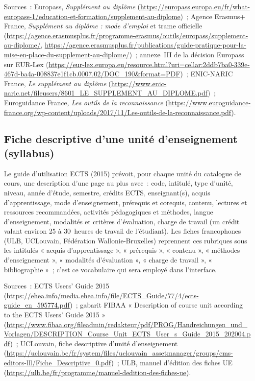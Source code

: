 \documentclass[11pt,a4paper]{article}
\begin{document}
Sources~: Europass, \emph{Supplément au diplôme}
(\url{https://europass.europa.eu/fr/what-europass-1/education-et-formation/supplement-au-diplome})~;
Agence Erasmus+ France, \emph{Supplément au diplôme : mode d'emploi} et trame officielle
(\url{https://agence.erasmusplus.fr/programme-erasmus/outils/europass/supplement-au-diplome/},
\url{https://agence.erasmusplus.fr/publications/guide-pratique-pour-la-mise-en-place-du-supplement-au-diplome/})~;
annexe~III de la décision Europass sur EUR-Lex
(\url{https://eur-lex.europa.eu/resource.html?uri=cellar:2ddb7ba0-339e-467d-ba4a-008837e1f1cb.0007.02/DOC_190&format=PDF})~;
ENIC-NARIC France, \emph{Le supplément au diplôme}
(\url{https://www.enic-naric.net/fileusers/8601_LE_SUPPLEMENT_AU_DIPLOME.pdf})~;
Euroguidance France, \emph{Les outils de la reconnaissance}
(\url{https://www.euroguidance-france.org/wp-content/uploads/2017/11/Les-outils-de-la-reconnaissance.pdf}).

\subsection{Fiche descriptive d'une unité d'enseignement (syllabus)}

Le guide d'utilisation ECTS (2015) prévoit, pour chaque unité du catalogue de cours, une
description d'une page au plus avec~: code, intitulé, type d'unité, niveau, année
d'étude, semestre, crédits ECTS, enseignant(s), acquis d'apprentissage, mode
d'enseignement, prérequis et corequis, contenu, lectures et ressources recommandées,
activités pédagogiques et méthodes, langue d'enseignement, modalités et critères
d'évaluation, charge de travail (un crédit valant environ 25 à 30~heures de travail de
l'étudiant). Les fiches francophones (ULB, UCLouvain, Fédération Wallonie-Bruxelles)
reprennent ces rubriques sous les intitulés « acquis d'apprentissage », « prérequis »,
« contenu », « méthodes d'enseignement », « modalités d'évaluation », « charge de travail
», « bibliographie »~; c'est ce vocabulaire qui sera employé dans l'interface.

Sources~: ECTS Users' Guide 2015
(\url{https://ehea.info/media.ehea.info/file/ECTS_Guide/77/4/ects-guide_en_595774.pdf})~;
gabarit FIBAA « Description of course unit according to the ECTS Users' Guide 2015 »
(\url{https://www.fibaa.org/fileadmin/redakteur/pdf/PROG/Handreichungen_und_Vorlagen/DESCRIPTION_Course_Unit_ECTS_User_s_Guide_2015_202004.pdf})~;
UCLouvain, fiche descriptive d'unité d'enseignement
(\url{https://uclouvain.be/fr/system/files/uclouvain_assetmanager/groups/cms-editors-lll/Fiche_Descriptive_0.pdf})~;
ULB, manuel d'édition des fiches UE
(\url{https://ulb.be/fr/programme/manuel-dedition-des-fiches-ue}).
\end{document}
